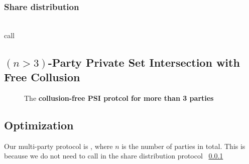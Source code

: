 \subsubsection{Share distribution}
\label{sect:share}

		 \\
		 call \todo{\SSOT} \\

\subsection{$(n>3)$-Party Private Set Intersection with Free Collusion}
\begin{figure}[h]\centering
{}
\caption{The \bf{collusion-free} PSI protcol for more than 3 parties}
\label{fig:npsicollud}
\end{figure}

\subsection{Optimization}
Our multi-party protocol is , where $n$ is the number of parties in total. This is because we do not need to call \SSOT in the share distribution protocol  ~\ref{sect:share}